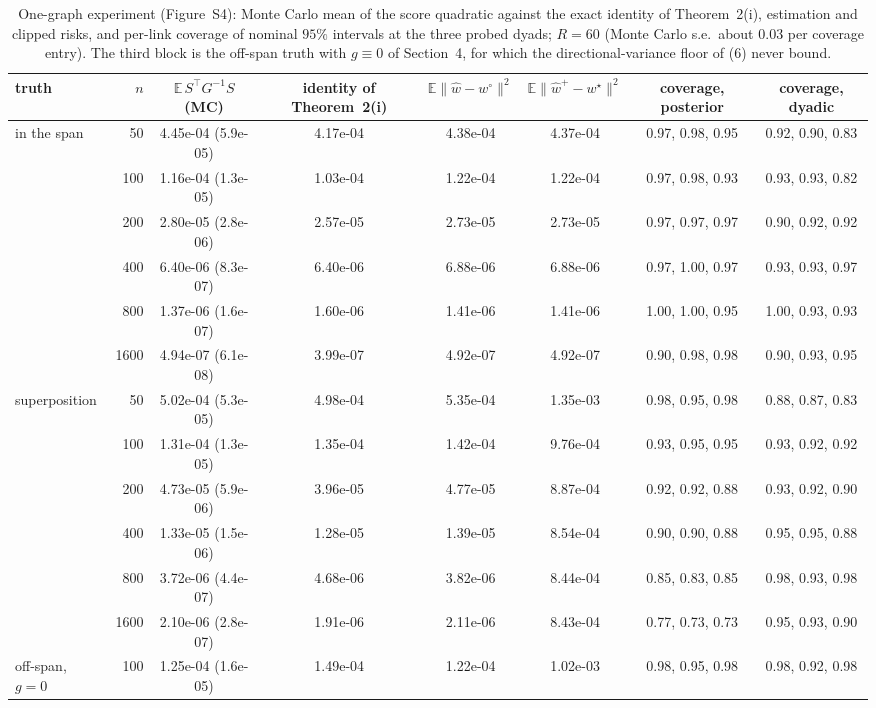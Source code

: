 \documentclass[12pt]{article}
\begin{document}
\begin{table}[ht]
\centering
\caption{One-graph experiment (Figure~S4): Monte Carlo mean of the score quadratic against the exact identity of Theorem~2(i), estimation and clipped risks, and per-link coverage of nominal $95\%$ intervals at the three probed dyads; $R=60$ (Monte Carlo s.e.\ about $0.03$ per coverage entry). The third block is the off-span truth with $g\equiv0$ of Section~4, for which the directional-variance floor of (6) never bound.}
\label{tab:onegraphtab}
\begin{tabular}{lrcccccc}
\toprule
truth & $n$ & $\mathbb{E}\,S^{\top}G^{-1}S$ (MC) & identity of Theorem~2(i) & $\mathbb{E}\|\hat w-w^\circ\|^2$ & $\mathbb{E}\|\hat w^{+}-w^\star\|^2$ & coverage, posterior & coverage, dyadic \\
\midrule
in the span & 50 & 4.45e-04 (5.9e-05) & 4.17e-04 & 4.38e-04 & 4.37e-04 & 0.97, 0.98, 0.95 & 0.92, 0.90, 0.83 \\
 & 100 & 1.16e-04 (1.3e-05) & 1.03e-04 & 1.22e-04 & 1.22e-04 & 0.97, 0.98, 0.93 & 0.93, 0.93, 0.82 \\
 & 200 & 2.80e-05 (2.8e-06) & 2.57e-05 & 2.73e-05 & 2.73e-05 & 0.97, 0.97, 0.97 & 0.90, 0.92, 0.92 \\
 & 400 & 6.40e-06 (8.3e-07) & 6.40e-06 & 6.88e-06 & 6.88e-06 & 0.97, 1.00, 0.97 & 0.93, 0.93, 0.97 \\
 & 800 & 1.37e-06 (1.6e-07) & 1.60e-06 & 1.41e-06 & 1.41e-06 & 1.00, 1.00, 0.95 & 1.00, 0.93, 0.93 \\
 & 1600 & 4.94e-07 (6.1e-08) & 3.99e-07 & 4.92e-07 & 4.92e-07 & 0.90, 0.98, 0.98 & 0.90, 0.93, 0.95 \\
superposition & 50 & 5.02e-04 (5.3e-05) & 4.98e-04 & 5.35e-04 & 1.35e-03 & 0.98, 0.95, 0.98 & 0.88, 0.87, 0.83 \\
 & 100 & 1.31e-04 (1.3e-05) & 1.35e-04 & 1.42e-04 & 9.76e-04 & 0.93, 0.95, 0.95 & 0.93, 0.92, 0.92 \\
 & 200 & 4.73e-05 (5.9e-06) & 3.96e-05 & 4.77e-05 & 8.87e-04 & 0.92, 0.92, 0.88 & 0.93, 0.92, 0.90 \\
 & 400 & 1.33e-05 (1.5e-06) & 1.28e-05 & 1.39e-05 & 8.54e-04 & 0.90, 0.90, 0.88 & 0.95, 0.95, 0.88 \\
 & 800 & 3.72e-06 (4.4e-07) & 4.68e-06 & 3.82e-06 & 8.44e-04 & 0.85, 0.83, 0.85 & 0.98, 0.93, 0.98 \\
 & 1600 & 2.10e-06 (2.8e-07) & 1.91e-06 & 2.11e-06 & 8.43e-04 & 0.77, 0.73, 0.73 & 0.95, 0.93, 0.90 \\
off-span, $g=0$ & 100 & 1.25e-04 (1.6e-05) & 1.49e-04 & 1.22e-04 & 1.02e-03 & 0.98, 0.95, 0.98 & 0.98, 0.92, 0.98 \\

\end{tabular}
\end{table}
\end{document}
